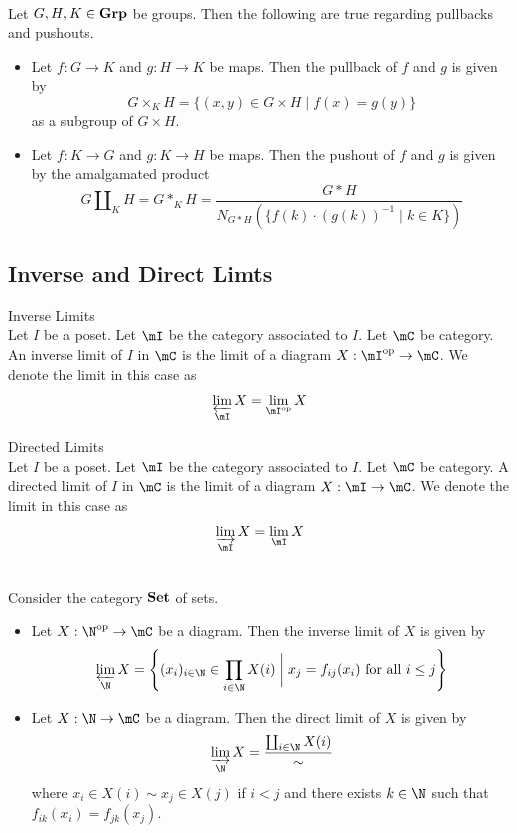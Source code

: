 \documentclass[a4paper]{article}
\begin{document}
\begin{prp}{}{}\\
Let $G,H,K\in\bold{Grp}$ be groups. Then the following are true regarding pullbacks and pushouts. 
\begin{itemize}
\item Let $f:G\to K$ and $g:H\to K$ be maps. Then the pullback of $f$ and $g$ is given by $$G\times_KH=\{(x,y)\in G\times H\;|\;f(x)=g(y)\}$$ as a subgroup of $G\times H$. 
\item Let $f:K\to G$ and $g:K\to H$ be maps. Then the pushout of $f$ and $g$ is given by the amalgamated product $$G\amalg_KH=G\ast_KH=\frac{G\ast H}{N_{G\ast H}(\{f(k)\cdot(g(k))^{-1}\;|\;k\in K\})}$$
\end{itemize}
\end{prp}

\subsection{Inverse and Direct Limts}
\begin{defn}{Inverse Limits}{}\\
Let $I$ be a poset. Let $\mI$ be the category associated to $I$. Let $\mC$ be category. An inverse limit of $I$ in $\mC$ is the limit of a diagram $X:\mI^\text{op}\to\mC$. We denote the limit in this case as $$\varprojlim_\mI X=\lim_{\mI^\text{op}}X$$
\end{defn}

\begin{defn}{Directed Limits}{}\\
Let $I$ be a poset. Let $\mI$ be the category associated to $I$. Let $\mC$ be category. A directed limit of $I$ in $\mC$ is the limit of a diagram $X:\mI\to\mC$. We denote the limit in this case as $$\varinjlim_\mI X=\lim_\mI X$$
\end{defn}

\begin{prp}{}{}\\
Consider the category $\bold{Set}$ of sets. 
\begin{itemize}
\item Let $X:\N^\text{op}\to\mC$ be a diagram. Then the inverse limit of $X$ is given by $$
\varprojlim_\N X=\left\{(x_i)_{i\in\N}\in\prod_{i\in\N}X(i)\;\bigg{|}\;x_j=f_{ij}(x_i)\text{ for all }i\leq j\right\}$$
\item Let $X:\N\to\mC$ be a diagram. Then the direct limit of $X$ is given by $$
\varinjlim_\N X=\frac{\coprod_{i\in\N}X(i)}{\sim}$$ where $x_i\in X(i)\sim x_j\in X(j)$ if $i<j$ and there exists $k\in\N$ such that $f_{ik}(x_i)=f_{jk}(x_j)$. 
\end{itemize}
\end{prp}
\end{document}
